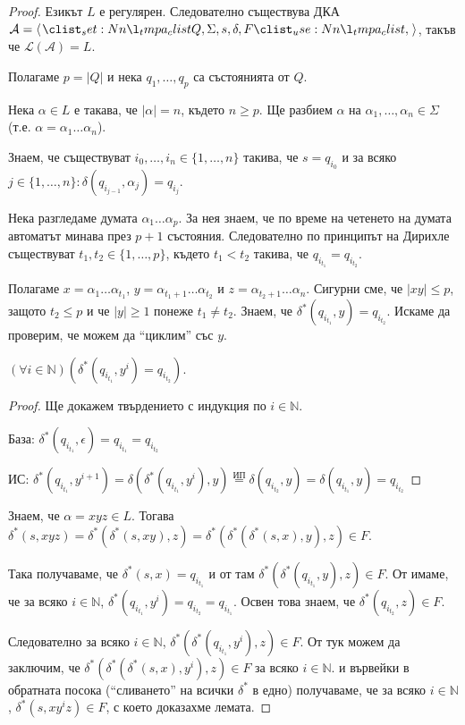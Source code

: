 \begin{proof}
    Езикът $L$ е регулярен.
    Следователно съществува ДКА
    $\mathcal{A} = \opair{Q, \Sigma, s, \delta, F}$,
    такъв че $\mathcal{L}(\mathcal{A}) = L$.

    Полагаме $p = |Q|$ и нека $q_1, \dots, q_p$ са състоянията от $Q$.

    Нека $\alpha \in L$ е такава, че $|\alpha| = n$, където $n \geq p$.
    Ще разбием $\alpha$ на $\alpha_1, \dots, \alpha_n \in \Sigma$ (т.е. $\alpha = \alpha_1\dots\alpha_n$).

    Знаем, че съществуват $i_0, \dots, i_n \in \{1, \dots, n \}$ такива,
    че $s = q_{i_0}$ и за всяко $j \in \{1, \dots, n\} : \delta(q_{i_{j-1}}, \alpha_j) = q_{i_j}$.

    Нека разгледаме думата $\alpha_1 \dots \alpha_p$.
    За нея знаем, че по време на четенето на думата автоматът минава през $p + 1$ състояния.
    Следователно по принципът на Дирихле съществуват
    $t_1, t_2 \in \{1, \dots, p\}$, където $t_1 < t_2$ такива, че $q_{i_{t_1}} = q_{i_{t_2}}$.

    Полагаме $x = \alpha_1 \dots \alpha_{t_1}$, $y = \alpha_{t_1 + 1} \dots \alpha_{t_2}$ и $z = \alpha_{t_2 + 1} \dots \alpha_n$.
    Сигурни сме, че $|xy| \leq p$, защото $t_2 \leq p$ и че $|y| \geq 1$ понеже $t_1 \neq t_2$.
    Знаем, че $\delta^*(q_{i_{t_1}}, y) = q_{i_{t_2}}$.
    Искаме да проверим, че можем да ``циклим'' със $y$.

    \begin{claim}
        $(\forall i \in \mathbb{N}) (\delta^*(q_{i_{t_1}}, y^i) = q_{i_{t_2}})$.
    \end{claim}

    \begin{proof}
        Ще докажем твърдението с индукция по $i \in \mathbb{N}$.

        База: $\delta^*(q_{i_{t_1}}, \epsilon) = q_{i_{t_1}} = q_{i_{t_2}}$ \checkmark

        ИС: $\delta^*(q_{i_{t_1}}, y^{i+1}) = \delta(\delta^*(q_{i_{t_1}}, y^i), y) \overset{\text{ИП}}{=} \delta(q_{i_{t_2}}, y) = \delta(q_{i_{t_1}}, y) = q_{i_{t_2}}$
    \end{proof}

    Знаем, че $\alpha = xyz \in L$.
    Тогава $\delta^*(s, xyz) = \delta^*(\delta^*(s, xy), z) = \delta^*(\delta^*(\delta^*(s, x), y), z) \in F$.

    Така получаваме, че $\delta^*(s, x) = q_{i_{t_1}}$ и от там $\delta^*(\delta^*(q_{i_{t_1}}, y), z) \in F$.
    От  имаме, че за всяко $ i \in \mathbb{N}$,  $\delta^*(q_{i_{t_1}}, y^i) = q_{i_{t_2}} = q_{i_{t_1}}$.
    Освен това знаем, че $\delta^*(q_{i_{t_2}}, z) \in F$.
    
    Следователно за всяко $i \in \mathbb{N}$, $\delta^*(\delta^*(q_{i_{t_1}}, y^i), z) \in F$.
    От тук можем да заключим, че $\delta^*(\delta^*(\delta^*(s, x), y^i), z) \in F$ за всяко $ i \in \mathbb{N}$.
    и вървейки в обратната посока (``сливането'' на всички $\delta^*$ в едно) получаваме,
    че за всяко $ i \in \mathbb{N}$, $\delta^*(s, xy^iz) \in F$, с което доказахме лемата.
\end{proof}

